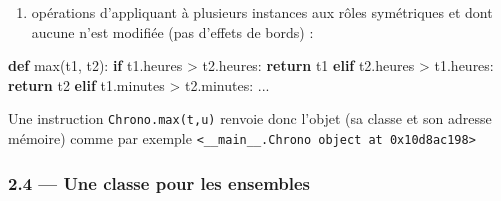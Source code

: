 \documentclass[a4paper,17pt]{extarticle}
\providecommand{\tightlist}{%
      \setlength{\itemsep}{0pt}\setlength{\parskip}{0pt}}
\newenvironment{Shaded}{}{}
\newcommand{\KeywordTok}[1]{\textcolor[rgb]{0.00,0.44,0.13}{\textbf{{#1}}}}
\newcommand{\NormalTok}[1]{{#1}}
\newcommand{\ControlFlowTok}[1]{\textcolor[rgb]{0.00,0.44,0.13}{\textbf{{#1}}}}
\newcommand{\OperatorTok}[1]{\textcolor[rgb]{0.40,0.40,0.40}{{#1}}}
\newcommand{\BuiltInTok}[1]{{#1}}
\begin{document}
\begin{exemple}
        \end{exemple}\begin{exemple}
    \begin{enumerate}
\def\labelenumi{(\arabic{enumi})}
\setcounter{enumi}{1}
\tightlist
\item
  opérations d'appliquant à plusieurs instances aux rôles symétriques et
  dont aucune n'est modifiée (pas d'effets de bords) :
\end{enumerate}

\begin{Shaded}
\begin{Highlighting}[]
\KeywordTok{def} \BuiltInTok{max}\NormalTok{(t1, t2):}
    \ControlFlowTok{if}\NormalTok{ t1.heures }\OperatorTok{\textgreater{}}\NormalTok{ t2.heures:}
        \ControlFlowTok{return}\NormalTok{ t1}
    \ControlFlowTok{elif}\NormalTok{ t2.heures }\OperatorTok{\textgreater{}}\NormalTok{ t1.heures:}
        \ControlFlowTok{return}\NormalTok{ t2}
    \ControlFlowTok{elif}\NormalTok{ t1.minutes }\OperatorTok{\textgreater{}}\NormalTok{ t2.minutes:}
\NormalTok{        ...}
\end{Highlighting}
\end{Shaded}

Une instruction \texttt{Chrono.max(t,u)} renvoie donc l'objet (sa classe
et son adresse mémoire) comme par exemple
\texttt{\textless{}\_\_main\_\_.Chrono\ object\ at\ 0x10d8ac198\textgreater{}}

        \end{exemple}
    \hypertarget{une-classe-pour-les-ensembles}{%
\subsubsection{2.4 --- Une classe pour les
ensembles}\label{une-classe-pour-les-ensembles}}
\end{document}
